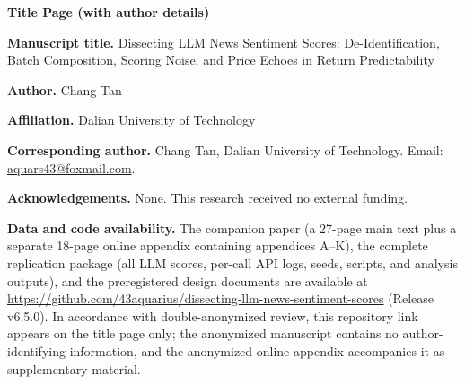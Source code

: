 \documentclass[11pt]{article}
\begin{document}
\begin{center}
{\Large\bfseries Title Page (with author details)}
\end{center}

\vspace{6pt}

\textbf{Manuscript title.}
Dissecting LLM News Sentiment Scores: De-Identification, Batch Composition, Scoring Noise, and Price Echoes in Return Predictability

\textbf{Author.}
Chang Tan

\textbf{Affiliation.}
Dalian University of Technology

\textbf{Corresponding author.}
Chang Tan, Dalian University of Technology. Email: \href{mailto:aquars43@foxmail.com}{aquars43@foxmail.com}.

\textbf{Acknowledgements.}
None. This research received no external funding.

\textbf{Data and code availability.}
The companion paper (a 27-page main text plus a separate 18-page online appendix containing appendices A--K), the complete replication package (all LLM scores, per-call API logs, seeds, scripts, and analysis outputs), and the preregistered design documents are available at \url{https://github.com/43aquarius/dissecting-llm-news-sentiment-scores} (Release v6.5.0). In accordance with double-anonymized review, this repository link appears on the title page only; the anonymized manuscript contains no author-identifying information, and the anonymized online appendix accompanies it as supplementary material.
\end{document}
